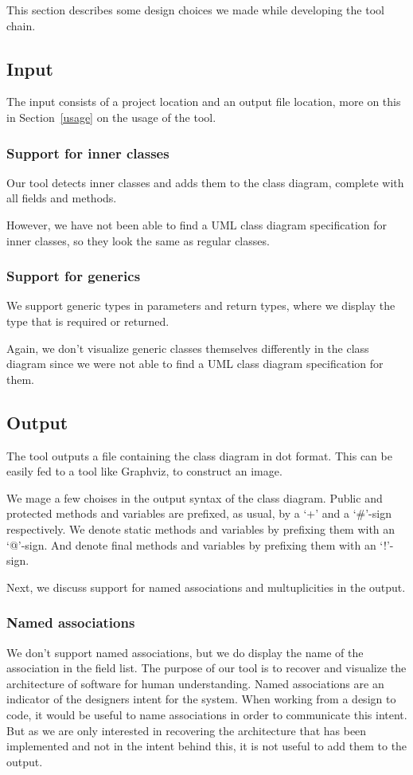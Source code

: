 This section describes some design choices we made while developing the tool chain.

\subsection{Input}
	The input consists of a project location and an output file location, more on this in Section~\ref{usage} on the usage of the tool.

	\subsubsection{Support for inner classes}
		Our tool detects inner classes and adds them to the class diagram, complete with all fields and methods.
		
		However, we have not been able to find a UML class diagram specification for inner classes, so they look the same as regular classes.
	\subsubsection{Support for generics}
		We support generic types in parameters and return types, where we display the type that is required or returned.
		
		Again, we don't visualize generic classes themselves differently in the class diagram since we were not able to find a UML class diagram specification for them.

\subsection{Output}
	The tool outputs a file containing the class diagram in dot format. 
	This can be easily fed to a tool like Graphviz, to construct an image.
	
	We mage a few choises in the output syntax of the class diagram. 
	Public and protected methods and variables are prefixed, as usual, by a `+' and a `\#'-sign respectively.
	We denote static methods and variables by prefixing them with an `@'-sign.
	And denote final methods and variables by prefixing them with an `!'-sign.
	
	Next, we discuss support for named associations and multuplicities in the output.

	\subsubsection{Named associations}
		We don't support named associations, but we do display the name of the association in the field list. 
		The purpose of our tool is to recover and visualize the architecture of software for human understanding.
		Named associations are an indicator of the designers intent for the system.
		When working from a design to code, it would be useful to name associations in order to communicate this intent.
		But as we are only interested in recovering the architecture that has been implemented and not in the intent behind this,
		it is not useful to add them to the output.
		
